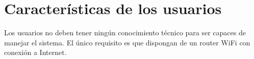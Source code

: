 \section{Características de los usuarios}

Los usuarios no deben tener ningún conocimiento técnico para ser capaces de manejar el sistema. El único requisito es que dispongan de un router WiFi con conexión a Internet.